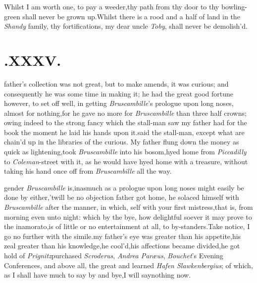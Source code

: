 \documentclass{article}
\begin{document}
Whilst I am worth one, to pay a\break
weeder,\tsk thy path from thy door to\break
thy bowling-green shall never be grown\break
up.\tsh Whilst there is a rood and a\break
half of land in the \textit{Shandy} family, thy\break
fortifications, my dear uncle \textit{Toby}, shall\break
never be demolish’d.

\null
\section{.\quad  XXXV.}

 father’s collection was not
great, but to make amends, it was curious; and consequently he was
some time in making it; he had the great good fortune however, to
set off well, in getting \textit{Bruscambille}’s prologue upon
long noses, almost for nothing,\tsk for he gave no more for
\textit{Bruscambille} than three half crowns; owing indeed to the
strong fancy which the stall-man saw my father had for the book the
moment he laid his hands upon it.\tsk {}\tsk said the
stall-man, except what are chain’d up in the libraries of the
curious. My father flung down the mo\-ney as quick as
lightening,\tsk took \textit{Brus\-cambille} into his
bosom,\tsh hyed home from \textit{Piccadilly} to
\textit{Coleman}-street with it, as he would have hyed home with a
treasure, without taking his hand once off from
\textit{Bruscambille}
all the way.

\break
gender \textit{Bruscambille} is,\tsk inasmuch as a prologue upon long noses might easily
be done by either,\tsk ’twill be no objection 
father got home, he solaced
himself with \textit{Bruscambille} after the manner, in which,
self with your
first mistress,\tsh that is, from morning even unto night:
which by the bye, how delightful soever it may prove to the
inamorato,\tsk is of little or no entertainment at all, to
by-standers.\tsk Take notice, I go no further with the
simile.\tsk my father’s eye was greater than his
appetite,\tsk his zeal greater than his know\-ledge,\tsk he
cool’d,\tsk his affections became divided,\tsh he
got hold of \textit{Prig\-nitz}\tsk purchased \textit{Scroderus}, \textit{Andrea
Paræ\-us}, \textit{Bouchet}’s Evening Conferences, and above all,
the great and learned \textit{Hafen Slawkenbergius}; of which, as I
shall have much to say by and bye,\tsk I will say\break nothing now.
\end{document}
